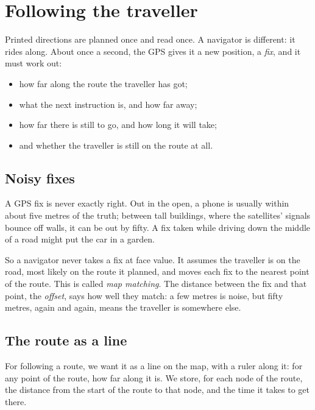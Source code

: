 \chapter{Following the traveller}\label{ch:following}

Printed directions are planned once and read once. A navigator is
different: it rides along. About once a second, the GPS gives it a new
position, a \emph{fix}, and it must work out:

\begin{itemize}[nosep]
  \item how far along the route the traveller has got;
  \item what the next instruction is, and how far away;
  \item how far there is still to go, and how long it will take;
  \item and whether the traveller is still on the route at all.
\end{itemize}

\section{Noisy fixes}

A GPS fix is never exactly right. Out in the open, a phone is usually
within about five metres of the truth; between tall buildings, where the
satellites' signals bounce off walls, it can be out by fifty. A fix taken
while driving down the middle of a road might put the car in a garden.

So a navigator never takes a fix at face value. It assumes the traveller
is on the road, most likely on the route it planned, and moves each fix to
the nearest point of the route. This is called \emph{map matching}. The
distance between the fix and that point, the \emph{offset}, says how well
they match: a few metres is noise, but fifty metres, again and again, means
the traveller is somewhere else.

\section{The route as a line}

For following a route, we want it as a line on the map, with a ruler
along it: for any point of the route, how far along it is. We store, for
each node of the route, the distance from the start of the route to that
node, and the time it takes to get there.

